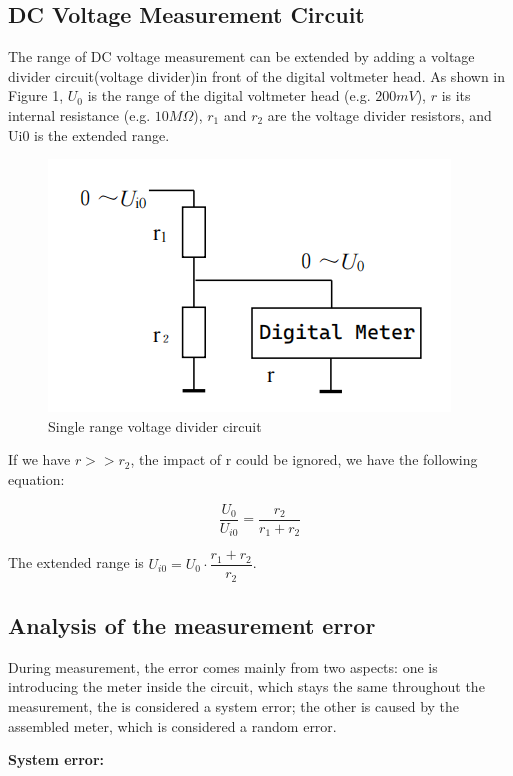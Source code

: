 \documentclass[a4paper]{article}
\begin{document}
\begin{multicols*}{2}
    \subsection*{DC Voltage Measurement Circuit}

    The range of DC voltage measurement can be extended by adding a voltage divider circuit(voltage divider)in front of the digital voltmeter head. As shown in Figure 1, $U_0$ is the range of the digital voltmeter head (e.g. $200mV$), $r$ is its internal resistance (e.g. $10MΩ$), $r_1$ and $r_2$ are the voltage divider resistors, and Ui0 is the extended range.

    \begin{figure}[H]
        \centering
        \includegraphics[width=0.8\linewidth]{./img/Fig.1.png}
        \caption{Single range voltage divider circuit}
        \label{fig:figure1}
    \end{figure}

    If we have $r >> r_2$, the impact of r could be ignored, we have the following equation:

    $$
        \dfrac{U_0}{U_{i0}} = \dfrac{r_2}{r_1 + r_2}
    $$

    The extended range is $U_{i0} = U_0 \cdot \dfrac{r_1 + r_2}{r_2}$.

    \subsection*{Analysis of the measurement error}

    During measurement, the error comes mainly from two aspects: one is introducing the meter inside the circuit, which stays the same throughout the measurement, the is considered a system error; the other is caused by the assembled meter, which is considered a random error.

    \textbf{System error:}


\end{multicols*}
\end{document}
